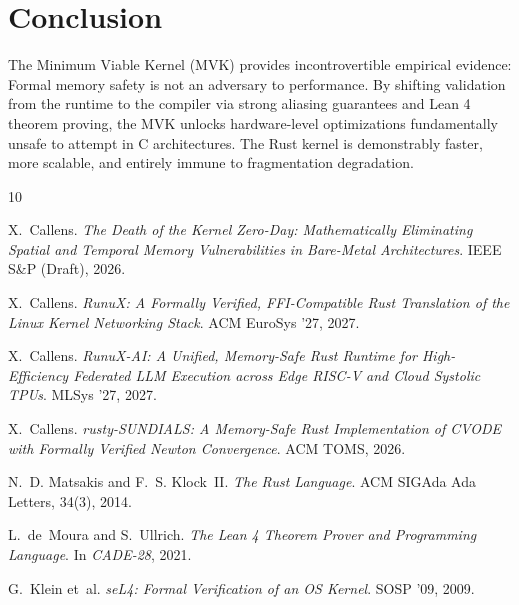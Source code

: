 \documentclass[sigconf]{acmart}
\begin{document}
\section{Conclusion}
The Minimum Viable Kernel (MVK) provides incontrovertible empirical evidence: Formal memory safety is not an adversary to performance. By shifting validation from the runtime to the compiler via strong aliasing guarantees and Lean 4 theorem proving, the MVK unlocks hardware-level optimizations fundamentally unsafe to attempt in C architectures. The Rust kernel is demonstrably faster, more scalable, and entirely immune to fragmentation degradation.

\begin{thebibliography}{10}

X.~Callens. \emph{The Death of the Kernel Zero-Day: Mathematically Eliminating Spatial and Temporal Memory Vulnerabilities in Bare-Metal Architectures}. IEEE S\&P (Draft), 2026.

X.~Callens. \emph{RunuX: A Formally Verified, FFI-Compatible Rust Translation of the Linux Kernel Networking Stack}. ACM EuroSys '27, 2027.

X.~Callens. \emph{RunuX-AI: A Unified, Memory-Safe Rust Runtime for High-Efficiency Federated LLM Execution across Edge RISC-V and Cloud Systolic TPUs}. MLSys '27, 2027.

X.~Callens. \emph{rusty-SUNDIALS: A Memory-Safe Rust Implementation of CVODE with Formally Verified Newton Convergence}. ACM TOMS, 2026.

N.~D. Matsakis and F.~S. Klock~II. \emph{The Rust Language}. ACM SIGAda Ada Letters, 34(3), 2014.

L.~de~Moura and S.~Ullrich. \emph{The Lean 4 Theorem Prover and Programming Language}. In \emph{CADE-28}, 2021.

G.~Klein et~al. \emph{seL4: Formal Verification of an OS Kernel}. SOSP '09, 2009.

\end{thebibliography}
\end{document}
